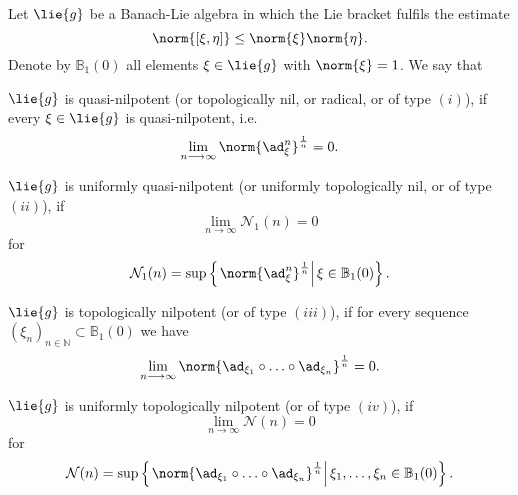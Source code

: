 \documentclass[
11pt,                          %
english                        %
]{article}
\begin{document}
\begin{definition}
	\label{def:nilpotencies}
	Let $\lie{g}$ be a Banach-Lie algebra in which the Lie bracket fulfils the 
	estimate
	\begin{equation*}
		\norm{ [\xi, \eta] }
		\leq
		\norm{\xi}
		\norm{\eta}.
	\end{equation*}
	Denote by $\mathbb{B}_1(0)$ all elements $\xi \in \lie{g}$ with 
	$\norm{\xi} = 1$. We say that
	\begin{definitionlist}
		\item
		$\lie{g}$ is quasi-nilpotent (or topologically nil, or radical, or 
		of type $(i)$), if every $\xi \in \lie{g}$ is quasi-nilpotent, i.e.
		\begin{equation*}
			\lim_{n \longrightarrow \infty}
			\norm{\ad_{\xi}^n}^{\frac{1}{n}}
			=
			0.
		\end{equation*}
		
		\item
		$\lie{g}$ is uniformly quasi-nilpotent (or uniformly topologically nil, or 
		of type $(ii)$), if
		\begin{equation*}
			\lim_{n \longrightarrow \infty}
			\mathcal{N}_1(n)
			=
			0
		\end{equation*}
		for
		\begin{equation}
			\mathcal{N}_1(n)
			=
			\sup \left\{ 
			\left.
				\norm{ \ad_{\xi}^n}^{\frac{1}{n}} 
			\right|
				\xi \in \mathbb{B}_1(0)
			\right\}.
		\end{equation}
		
		\item
		$\lie{g}$ is topologically nilpotent (or of type 
		$(iii)$), if for every sequence
		$(\xi_n)_{n \in \mathbb{N}} \subset \mathbb{B}_1(0)$ we have
		\begin{equation*}
			\lim_{n \longrightarrow \infty}
			\norm{ 
				\ad_{\xi_1} \circ \ldots \circ \ad_{\xi_n}
			}^{\frac{1}{n}}
			=
			0.
		\end{equation*}
		
		\item
		$\lie{g}$ is uniformly topologically nilpotent (or of 
		type $(iv)$), if
		\begin{equation*}
			\lim_{n \longrightarrow \infty}
			\mathcal{N}(n)
			=
			0
		\end{equation*}
		for
		\begin{equation}
			\mathcal{N}(n)
			=
			\sup \left\{ 
			\left.
				\norm{ 
					\ad_{\xi_1} \circ \ldots \circ \ad_{\xi_n}
				}^{\frac{1}{n}} 
			\right|
				\xi_1, \ldots, \xi_n \in \mathbb{B}_1(0)
			\right\}.
		\end{equation}
	\end{definitionlist}
\end{definition}
\end{document}
